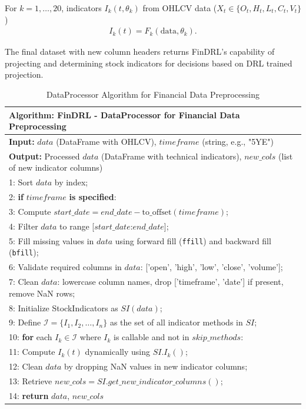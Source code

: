 For \( k = 1, \ldots, 20 \), indicators \( I_k(t, \theta_k) \) from OHLCV data (\( X_t \in \{O_t, H_t, L_t, C_t, V_t\} \))
\begin{align}
   I_k(t) = F_k(\text{data}, \theta_k).
\end{align}


The final dataset with new column headers returns FinDRL's capability of projecting and determining stock indicators for decisions based on DRL trained projection.


\begin{table}[h]
\small
\centering
\begin{tabular}{|p{16cm}|}
\hline
\textbf{Algorithm: FinDRL - DataProcessor for Financial Data Preprocessing} \\
\hline
\textbf{Input:} $data$ (DataFrame with OHLCV), $timeframe$ (string, e.g., "5YE") \\
\textbf{Output:} Processed $data$ (DataFrame with technical indicators), $new\_cols$ (list of new indicator columns) \\
\hline
1: Sort $data$ by index; \\
2: \textbf{if} $timeframe$ \textbf{is specified}: \\
3: \quad Compute $start\_date = end\_date - \text{to\_offset}(timeframe)$; \\
4: \quad Filter $data$ to range [$start\_date$:$end\_date$]; \\
5: Fill missing values in $data$ using forward fill (\texttt{ffill}) and backward fill (\texttt{bfill}); \\
6: Validate required columns in $data$: ['open', 'high', 'low', 'close', 'volume']; \\
7: Clean $data$: lowercase column names, drop ['timeframe', 'date'] if present, remove NaN rows; \\
8: Initialize StockIndicators as $SI(data)$; \\
9: Define $\mathcal{I} = \{I_1, I_2, \ldots, I_n\}$ as the set of all indicator methods in $SI$; \\
10: \textbf{for} each $I_k \in \mathcal{I}$ where $I_k$ is callable and not in $skip\_methods$: \\
11: \quad Compute $I_k(t)$ dynamically using $SI.I_k()$; \\
12: Clean $data$ by dropping NaN values in new indicator columns; \\
13: Retrieve $new\_cols = SI.get\_new\_indicator\_columns()$; \\
14: \textbf{return} $data$, $new\_cols$ \\
\hline
\end{tabular}
\caption{DataProcessor Algorithm for Financial Data Preprocessing}
\label{tab:findrl_dataprocessor_algorithm}
\end{table}


